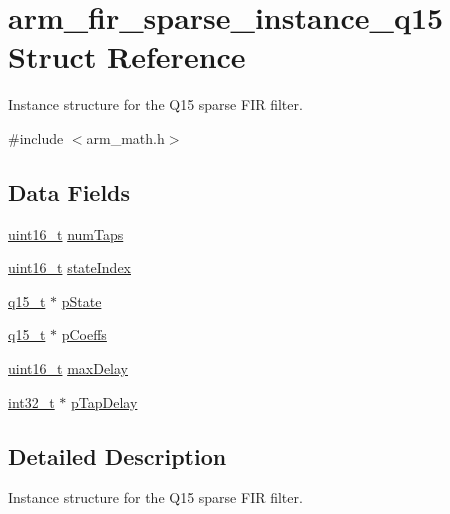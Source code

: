 \hypertarget{structarm__fir__sparse__instance__q15}{\section{arm\-\_\-fir\-\_\-sparse\-\_\-instance\-\_\-q15 Struct Reference}
\label{structarm__fir__sparse__instance__q15}
}


Instance structure for the Q15 sparse F\-I\-R filter.  




{\ttfamily \#include $<$arm\-\_\-math.\-h$>$}

\subsection*{Data Fields}
\begin{DoxyCompactItemize}
\item 
\hyperlink{stdint_8h_a273cf69d639a59973b6019625df33e30}{uint16\-\_\-t} \hyperlink{structarm__fir__sparse__instance__q15_a0f66b126dd8b85f7467cfb01b7bc4d77}{num\-Taps}
\item 
\hyperlink{stdint_8h_a273cf69d639a59973b6019625df33e30}{uint16\-\_\-t} \hyperlink{structarm__fir__sparse__instance__q15_a89487f28cab52637426024005e478985}{state\-Index}
\item 
\hyperlink{arm__math_8h_ab5a8fb21a5b3b983d5f54f31614052ea}{q15\-\_\-t} $\ast$ \hyperlink{structarm__fir__sparse__instance__q15_a98b92b0f5208110129b9a67b1db90408}{p\-State}
\item 
\hyperlink{arm__math_8h_ab5a8fb21a5b3b983d5f54f31614052ea}{q15\-\_\-t} $\ast$ \hyperlink{structarm__fir__sparse__instance__q15_a78a6565473b5f0b8c77c3f0f58a76069}{p\-Coeffs}
\item 
\hyperlink{stdint_8h_a273cf69d639a59973b6019625df33e30}{uint16\-\_\-t} \hyperlink{structarm__fir__sparse__instance__q15_ad14cc1070eecf7e1926d8f67a8273182}{max\-Delay}
\item 
\hyperlink{group___n_a_m_e_gafd12020da5a235dfcf0c3c748fb5baed}{int32\-\_\-t} $\ast$ \hyperlink{structarm__fir__sparse__instance__q15_aeab2855176c6efdb231a73a3672837d5}{p\-Tap\-Delay}
\end{DoxyCompactItemize}


\subsection{Detailed Description}
Instance structure for the Q15 sparse F\-I\-R filter. 

